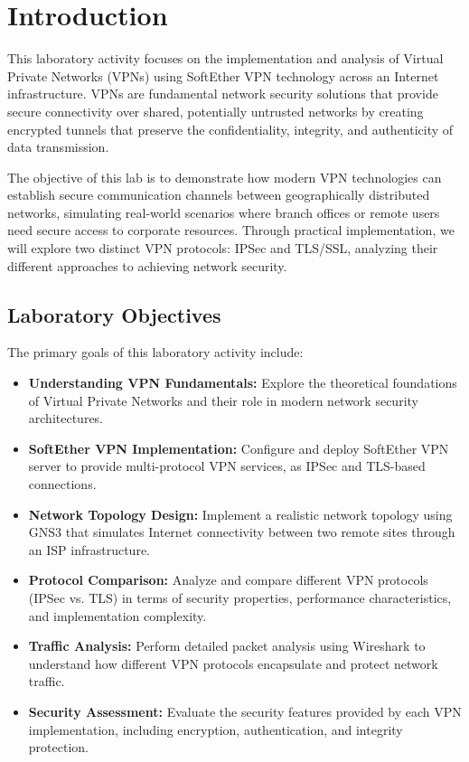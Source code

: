 \newpage

\section{Introduction}

This laboratory activity focuses on the implementation and analysis of Virtual Private Networks (VPNs) using SoftEther VPN technology across an Internet infrastructure. VPNs are fundamental network security solutions that provide secure connectivity over shared, potentially untrusted networks by creating encrypted tunnels that preserve the confidentiality, integrity, and authenticity of data transmission.

The objective of this lab is to demonstrate how modern VPN technologies can establish secure communication channels between geographically distributed networks, simulating real-world scenarios where branch offices or remote users need secure access to corporate resources. Through practical implementation, we will explore two distinct VPN protocols: IPSec and TLS/SSL, analyzing their different approaches to achieving network security.

\subsection{Laboratory Objectives}

The primary goals of this laboratory activity include:

\begin{itemize}
    \item \textbf{Understanding VPN Fundamentals:} Explore the theoretical foundations of Virtual Private Networks and their role in modern network security architectures.
    
    \item \textbf{SoftEther VPN Implementation:} Configure and deploy SoftEther VPN server to provide multi-protocol VPN services, as IPSec and TLS-based connections.
    
    \item \textbf{Network Topology Design:} Implement a realistic network topology using GNS3 that simulates Internet connectivity between two remote sites through an ISP infrastructure.
    
    \item \textbf{Protocol Comparison:} Analyze and compare different VPN protocols (IPSec vs. TLS) in terms of security properties, performance characteristics, and implementation complexity.
    
    \item \textbf{Traffic Analysis:} Perform detailed packet analysis using Wireshark to understand how different VPN protocols encapsulate and protect network traffic.
    
    \item \textbf{Security Assessment:} Evaluate the security features provided by each VPN implementation, including encryption, authentication, and integrity protection.
\end{itemize}

